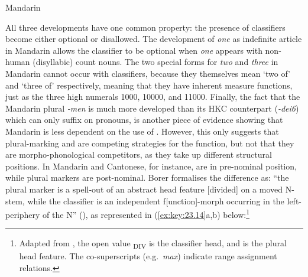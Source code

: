 \documentclass[output=paper]{langsci/langscibook}
\begin{document}
\ea\label{ex:key:23.13} Mandarin %
	\z
\z

All three developments have one common property: the presence of classifiers
become either optional or disallowed. The development of \emph{one} as
indefinite article in Mandarin allows the classifier to be optional when
\emph{one} appears with non-human (disyllabic) count nouns. The two special
forms for \emph{two} and \emph{three} in Mandarin cannot occur with
classifiers, because they themselves mean ‘two of’ and ‘three of’ respectively,
meaning that they have inherent measure functions, just as the three high
numerals 1000, 10000, and 11000. Finally, the fact that the Mandarin plural
\emph{-men} is much more developed than its \gls{HKC} counterpart
(\emph{-dei6}) which can only suffix on pronouns, is another piece of evidence
showing that Mandarin  is less dependent on the use of .
However, this only suggests that plural-marking and  are competing
strategies for the  function, but not that they are
morpho-phonological competitors, as they take up different structural
positions. In Mandarin and Cantonese, for instance,  are in
pre-nominal position, while plural markers are post-nominal. Borer formalises
the difference as: “the plural marker is a spell-out of an abstract head
feature  [divided] on a moved N-stem, while the
classifier is an independent f[unction]-morph occurring in the
left-periphery of the N” (\citeyear[95]{Borer2005}), as represented in
(\ref{ex:key:23.14}a,b)
below:\footnote{Adapted from \citet[95]{Borer2005}, the open value
    \textsubscript{DIV} is the classifier head, and
 is the plural head feature. The co-superscripts (e.g.\ \emph{max})
indicate range assignment relations.}
\end{document}
